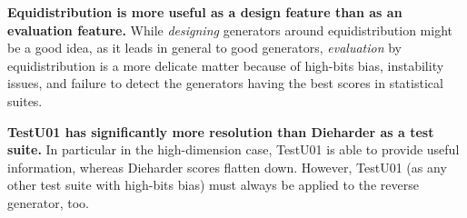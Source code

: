\documentclass{acmsmalltr}
\begin{document}
\smallskip\noindent\textbf{Equidistribution is more useful as a design feature
than as an evaluation feature.} While \emph{designing} generators around
equidistribution might be a good idea, as it leads in general to good
generators, \emph{evaluation} by equidistribution is a more delicate matter
because of high-bits bias, instability issues, and failure to detect the generators having the
best scores in statistical suites.

\smallskip\noindent\textbf{TestU01 has significantly more resolution than
Dieharder as a test suite.} In particular in the high-dimension case, TestU01 is
able to provide useful information, whereas Dieharder scores flatten down.
However, TestU01 (as any other test suite with high-bits bias) must always be
applied to the reverse generator, too.



\end{document}
